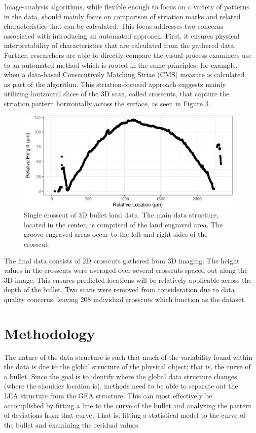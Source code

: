 \documentclass[12pt]{article}
\begin{document}
Image-analysis algorithms, while flexible enough to focus on a variety
of patterns in the data, should mainly focus on comparison of striation
marks and related characteristics that can be calculated. This focus
addresses two concerns associated with introducing an automated
approach. First, it ensures physical interpretability of characteristics
that are calculated from the gathered data. Further, researchers are
able to directly compare the visual process examiners use to an
automated method which is rooted in the same principles; for example,
when a data-based Consecutively Matching Striae (CMS) measure is
calculated as part of the algorithm. This striation-focused approach
suggests mainly utilizing horizontal slices of the 3D scan, called
crosscuts, that capture the striation pattern horizontally across the
surface, as seen in Figure 3.

\begin{figure}
\centering
\includegraphics{writeup_files/figure-latex/unnamed-chunk-2-1.pdf}
\caption{Single crosscut of 3D bullet land data. The main data
structure, located in the center, is comprised of the land engraved
area. The groove engraved areas occur to the left and right sides of the
crosscut.}
\end{figure}

The final data consists of 2D crosscuts gathered from 3D imaging. The
height values in the crosscuts were averaged over several crosscuts
spaced out along the 3D image. This ensures predicted locations will be
relatively applicable across the depth of the bullet. Two scans were
removed from consideration due to data quality concerns, leaving 208
individual crosscuts which function as the dataset.

\section{Methodology}

The nature of the data structure is such that much of the variability
found within the data is due to the global structure of the physical
object; that is, the curve of a bullet. Since the goal is to identify
where the global data structure changes (where the shoulder location
is), methods need to be able to separate out the LEA structure from the
GEA structure. This can most effectively be accomplished by fitting a
line to the curve of the bullet and analyzing the pattern of deviations
from that curve. That is, fitting a statistical model to the curve of
the bullet and examining the residual values.
\end{document}
